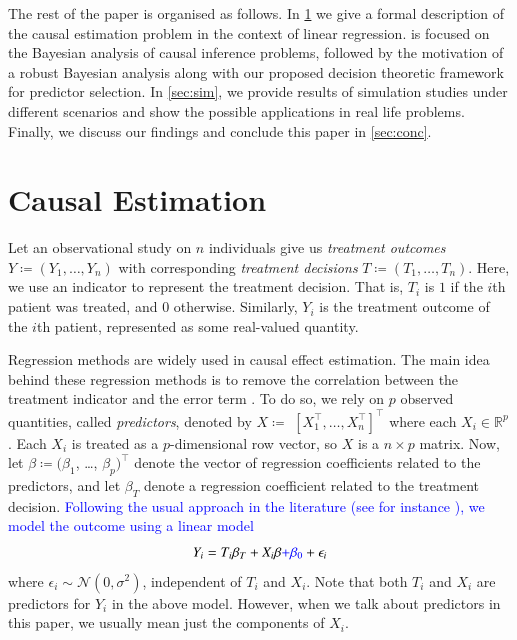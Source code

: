 \documentclass[preprint,12pt]{elsarticle}
\newcommand{\added}[1]{\textcolor{blue}{#1}}
\begin{document}
The rest of the paper is organised as follows. In \cref{sec:causal}
we give a formal description of the causal estimation problem in the
context of linear regression.  is focused on the
Bayesian analysis of causal inference problems, followed by the
motivation of a robust Bayesian analysis along with our proposed decision 
theoretic framework for predictor selection. In \cref{sec:sim}, 
we provide results of simulation studies under different scenarios 
and show the possible applications in real life problems. Finally, 
we discuss our findings and conclude this paper in \cref{sec:conc}.

\section{Causal Estimation}\label{sec:causal}

Let an observational study on $n$ individuals give us
\emph{treatment outcomes} $Y\coloneqq(Y_1, \dots, Y_n)$ with 
corresponding \emph{treatment decisions} $T\coloneqq(T_1, \dots, T_n)$.
Here, we use an indicator to represent the treatment decision. That is, $T_i$ is $1$ if the $i$th patient was treated, and $0$ otherwise. Similarly,
$Y_i$ is the treatment outcome of the $i$th patient, represented as some real-valued quantity.

Regression methods are widely used in causal effect estimation. The
main idea behind these regression methods is to remove the
correlation between the treatment indicator and the error term
\citep{winship99,HECKMAN1985}.
To do so, we rely on $p$ observed quantities, called
\emph{predictors}, denoted by $X\coloneqq$ $[X_1^{\top}, \dots, X_n^{\top}]^{\top}$
where each $X_i\in\mathbb{R}^p$.
Each $X_i$ is treated as a $p$-dimensional row vector,
so $X$ is a $n\times p$ matrix.
Now, let
$\beta \coloneqq (\beta_1$, \dots, $\beta_p)^{\top}$ denote the vector of regression
coefficients
related to the predictors, and let $\beta_T$ denote a regression coefficient related to the
treatment decision.
\added{%
Following the usual approach in the literature
(see for instance \citep{winship99,HECKMAN1985}),
we model the outcome using a linear model%
}
\begin{equation}
	Y_i =  T_i \beta_{T} + X_i\beta \added{+ \beta_0} + \epsilon_i
\end{equation}
where $\epsilon_i\sim \mathcal{N}(0, \sigma^2)$,
independent of $T_i$ and $X_i$.
Note that both $T_i$ and $X_i$ are predictors for $Y_i$ in the above model.
However, when we talk about predictors in this paper, we usually mean just the components of $X_i$.
\end{document}
